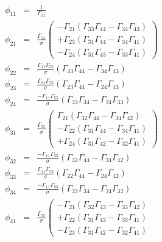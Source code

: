 \begin{eqnarray}
\phi_{11} &=& \frac{1}{\Gamma_{11}}
\nonumber
\\
\phi_{21} &=& \frac{\Gamma_{55}}{\sigma}
\left(
\begin{array}{r}
-\Gamma_{21} \left(\Gamma_{33} \Gamma_{44} - \Gamma_{34} \Gamma_{43} \right)
\\
+\Gamma_{23} \left(\Gamma_{31} \Gamma_{44} - \Gamma_{34} \Gamma_{41} \right)
\\
-\Gamma_{24} \left(\Gamma_{31} \Gamma_{43} - \Gamma_{33} \Gamma_{41} \right)
\end{array}
\right)
\nonumber
\\
\phi_{22} &=& \frac{\Gamma_{11} \Gamma_{55}}{\sigma}
\left(\Gamma_{33} \Gamma_{44} - \Gamma_{34} \Gamma_{43} \right)
\nonumber
\\
\phi_{23} &=& \frac{\Gamma_{11} \Gamma_{55}}{\sigma}
\left(\Gamma_{23} \Gamma_{44} - \Gamma_{24} \Gamma_{43} \right)
\nonumber
\\
\phi_{24} &=& \frac{-\Gamma_{11} \Gamma_{55}}{\sigma}
\left(\Gamma_{23} \Gamma_{34} - \Gamma_{24} \Gamma_{33} \right)
\nonumber
\\
\phi_{31} &=& \frac{\Gamma_{55}}{\sigma}
\left(
\begin{array}{r}
 \Gamma_{21} \left(\Gamma_{32} \Gamma_{44} - \Gamma_{34} \Gamma_{42} \right)
\\
-\Gamma_{22} \left(\Gamma_{31} \Gamma_{44} - \Gamma_{34} \Gamma_{41} \right)
\\
+\Gamma_{24} \left(\Gamma_{31} \Gamma_{42} - \Gamma_{32} \Gamma_{41} \right)
\end{array}
\right)
\nonumber
\\
\phi_{32} &=& \frac{-\Gamma_{11} \Gamma_{55}}{\sigma}
\left(\Gamma_{32} \Gamma_{44} - \Gamma_{34} \Gamma_{42} \right)
\nonumber
\\
\phi_{33} &=& \frac{\Gamma_{11} \Gamma_{55}}{\sigma}
\left(\Gamma_{22} \Gamma_{44} - \Gamma_{24} \Gamma_{42} \right)
\nonumber
\\
\phi_{34} &=& \frac{-\Gamma_{11} \Gamma_{55}}{\sigma}
\left(\Gamma_{22} \Gamma_{34} - \Gamma_{24} \Gamma_{32} \right)
\nonumber
\\
\phi_{41} &=& \frac{\Gamma_{55}}{\sigma}
\left(
\begin{array}{r}
-\Gamma_{21} \left(\Gamma_{32} \Gamma_{43} - \Gamma_{33} \Gamma_{42} \right)
\\
+\Gamma_{22} \left(\Gamma_{31} \Gamma_{43} - \Gamma_{33} \Gamma_{41} \right)
\\
-\Gamma_{23} \left(\Gamma_{31} \Gamma_{42} - \Gamma_{32} \Gamma_{41} \right)

\end{array}
\end{eqnarray}
